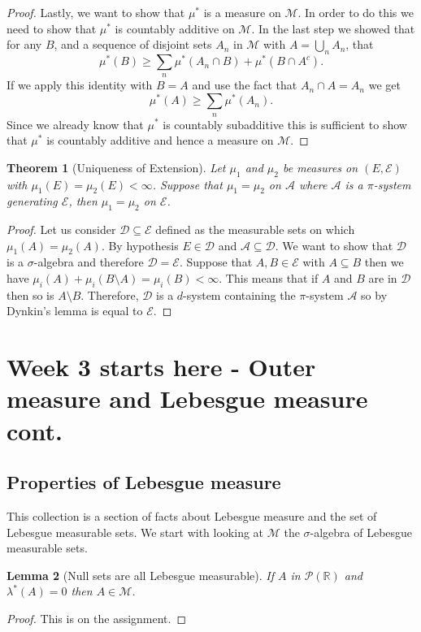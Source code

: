 \documentclass[11pt]{article}
\newtheorem{thm}{Theorem}[section]
\newtheorem{lem}[thm]{Lemma}
\theoremstyle{definition}
\theoremstyle{remark}
\begin{document}
\begin{proof}
Lastly, we want to show that $\mu^*$ is a measure on $\mathscr{M}$. In order to do this we need to show that $\mu^*$ is countably additive on $\mathscr{M}$. In the last step we showed that for any $B$, and a sequence of disjoint sets $A_n$ in $\mathscr{M}$ with $A= \bigcup_n A_n$, that
\[ \mu^*(B) \geq \sum_n \mu^*(A_n \cap B) + \mu^*(B \cap A^c). \] If we apply this identity with $B=A$ and use the fact that $A_n \cap A = A_n$ we get
\[ \mu^*(A) \geq \sum_n \mu^*(A_n). \] Since we already know that $\mu^*$ is countably subadditive this is sufficient to show that $\mu^*$ is countably additive and hence a measure on $\mathscr{M}$.
\end{proof}

\begin{thm}[Uniqueness of Extension]
Let $\mu_1$ and $\mu_2$ be measures on $(E,\mathcal{E})$ with $\mu_1(E) = \mu_2(E) < \infty$. Suppose that $\mu_1 = \mu_2$ on $\mathcal{A}$ where $\mathcal{A}$ is a $\pi$-system generating $\mathcal{E}$, then $\mu_1 = \mu_2$ on $\mathcal{E}$.
\end{thm}
\begin{proof}
Let us consider $\mathcal{D} \subseteq \mathcal{E}$ defined as the measurable sets on which $\mu_1(A) = \mu_2(A)$. By hypothesis $E \in \mathcal{D}$ and $\mathcal{A} \subseteq \mathcal{D}$. We want to show that $\mathcal{D}$ is a $\sigma$-algebra and therefore $\mathcal{D} = \mathcal{E}$. Suppose that $A, B \in \mathcal{E}$ with $A \subseteq B$ then we have $\mu_i(A) + \mu_i (B \setminus A) = \mu_i(B) < \infty.$ This means that if $A$ and $B$ are in $\mathcal{D}$ then so is $A \setminus B$. Therefore, $\mathcal{D}$ is a $d$-system containing the $\pi$-system $\mathcal{A}$ so by Dynkin's lemma is equal to $\mathcal{E}$.
\end{proof}


\section{Week 3 starts here - Outer measure and Lebesgue measure cont.}
\subsection{Properties of Lebesgue measure}
This collection is a section of facts about Lebesgue measure and the set of Lebesgue measurable sets. We start with looking at $\mathscr{M}$ the $\sigma$-algebra of Lebesgue measurable sets. 

\begin{lem}[Null sets are all Lebesgue measurable]
If $A$ in $\mathscr{P}(\mathbb{R})$ and $\lambda^*(A) =0$ then $A \in \mathscr{M}$.
\end{lem}
\begin{proof}
This is on the assignment. 
\end{proof}
\end{document}
